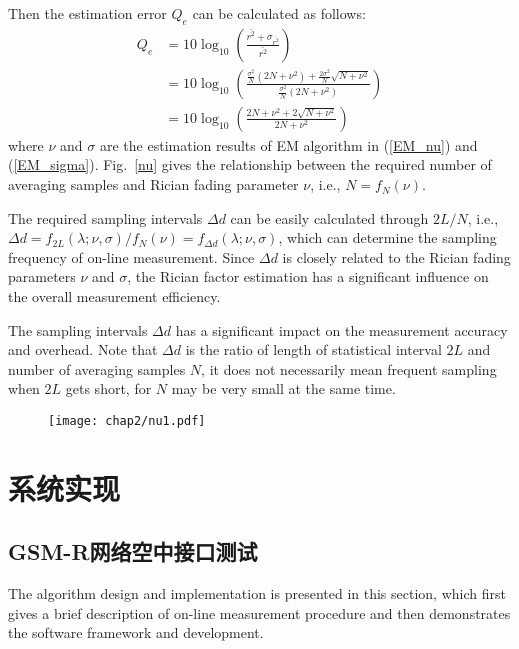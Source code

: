 Then the estimation error $Q_e$ can be calculated as follows:
\begin{equation}
\begin{split}
    Q_e&=10 \log_{10}\left(\frac{\bar{r^2}+\sigma_{\bar{r^2}}}{\bar{r^2}}\right)\\
    &=10 \log_{10}\left(\frac{\frac{\sigma^2}{N}\left(2N+\nu^2\right)+\frac{2\sigma^2}{N}\sqrt{N+\nu^2}}{\frac{\sigma^2}{N}(2N+\nu^2)}\right)\\
    &=10 \log_{10}\left(\frac{2N+\nu^2+2\sqrt{N+\nu^2}}{2N+\nu^2}\right)
\end{split}
\label{app:Q_e}
\end{equation}
where $\nu$ and $\sigma$ are the estimation results of EM algorithm in (\ref{EM_nu}) and (\ref{EM_sigma}). Fig.~\ref{nu} gives the relationship between the required number of averaging samples and Rician fading parameter $\nu$, i.e., $N=f_{N}(\nu)$.

The required sampling intervals $\Delta d$ can be easily calculated through $2L/N$, i.e., $\Delta d=f_{2L}(\lambda;\nu,\sigma)/f_{N}(\nu)=f_{\Delta d}(\lambda;\nu,\sigma)$, which can determine the sampling frequency of on-line measurement. Since $\Delta d$ is closely related to the Rician fading parameters $\nu$ and $\sigma$, the Rician factor estimation has a significant influence on the overall measurement efficiency.

The sampling intervals $\Delta d$ has a significant impact on the measurement accuracy and overhead. Note that $\Delta d$ is the ratio of length of statistical interval $2L$ and number of averaging samples $N$, it does not necessarily mean frequent sampling when $2L$ gets short, for $N$ may be very small at the same time.

\begin{figure}[!htp]
\centerline{
\texttt{[image: chap2/nu1.pdf]}
}
\end{figure}


\section{系统实现}
\label{sec:system_phy}

\subsection{GSM-R网络空中接口测试}
\label{sec:um}

The algorithm design and implementation is presented in this section, which first gives a brief description of on-line measurement procedure and then demonstrates the software framework and development.


